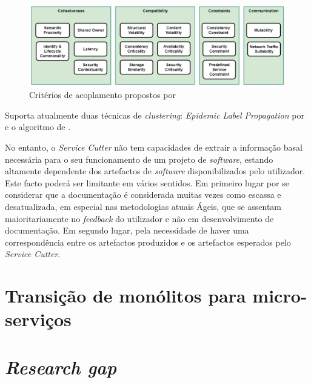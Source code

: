 	\begin{figure}[h]
     	\begin{center}
     		\includegraphics[width=\textwidth]{img/service_cutter_16_criteria.png}
     	\end{center}
     	\caption{Critérios de acoplamento propostos por \cite{gysel16_service_cutter}}
     	\label{fig:service_cutter_16}
 	\end{figure}
   
   Suporta atualmente duas técnicas de \textit{clustering}: \textit{Epidemic Label Propagation} por \cite{leung2009TowardsRC} e o algoritmo de \cite{girvan01_community_structure_cluster}.
   
   No entanto, o \textit{Service Cutter} não tem capacidades de extrair a informação basal necessária para o seu funcionamento de um projeto de \textit{software}, estando altamente dependente dos artefactos de \textit{software} disponibilizados pelo utilizador. Este facto poderá ser limitante em vários sentidos. Em primeiro lugar por se considerar que a documentação é considerada muitas vezes como escassa e desatualizada, em especial nas metodologias atuais Ágeis, que se assentam maioritariamente no \textit{feedback} do utilizador e não em desenvolvimento de documentação. Em segundo lugar, pela necessidade de haver uma correspondência entre os artefactos produzidos e os artefactos esperados pelo \textit{Service Cutter}. 
   



\section{Transição de monólitos para micro-serviços}

\section{\textit{Research gap}}

